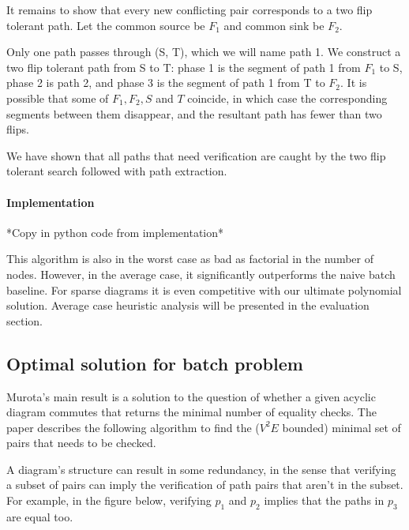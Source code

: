 \documentclass{article}
\begin{document}
It remains to show that every new conflicting pair corresponds to a two flip tolerant path. Let the common source be $F_1$ and common sink be $F_2$. 

Only one path passes through (S, T), which we will name path 1. We construct a two flip tolerant path from S to T: phase 1 is the segment of path 1 from $F_1$ to S, phase 2 is path 2, and phase 3 is the segment of path 1 from T to $F_2$. It is possible that some of $F_1, F_2, S$ and $T$ coincide, in which case the corresponding segments between them disappear, and the resultant path has fewer than two flips.

We have shown that all paths that need verification are caught by the two flip tolerant search followed with path extraction.

\paragraph{Implementation}
*Copy in python code from implementation*

This algorithm is also in the worst case as bad as factorial in the number of nodes. However, in the average case, it significantly outperforms the naive batch baseline. For sparse diagrams it is even competitive with our ultimate polynomial solution. Average case heuristic analysis will be presented in the evaluation section.

\subsection{Optimal solution for batch problem}
Murota's main result \cite{commutative} is a solution to the question of whether a given acyclic diagram commutes that returns the minimal number of equality checks. The paper describes the following algorithm to find the ($V^2E$ bounded) minimal set of pairs that needs to be checked.

A diagram's structure can result in some redundancy, in the sense that verifying a subset of pairs can imply the verification of path pairs that aren't in the subset.
For example, in the figure below, verifying $p_1$ and $p_2$ implies that the paths in $p_3$ are equal too.
\end{document}
